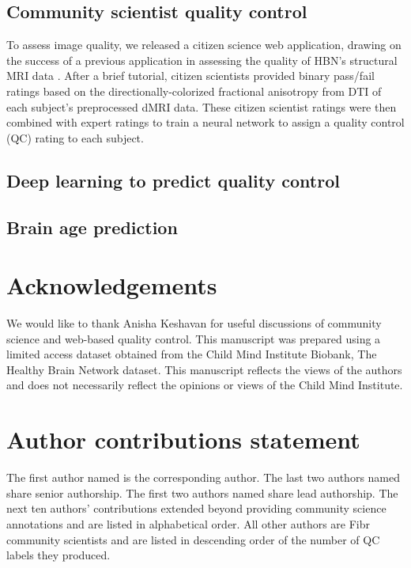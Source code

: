 \documentclass[fleqn,10pt]{wlscirep}
\begin{document}
\subsection*{Community scientist quality control}

To assess image quality, we released a citizen science web application, drawing on the success of a previous application in assessing the quality of HBN's structural MRI data \cite{keshavan2019-er}. After a brief tutorial, citizen scientists provided binary pass/fail ratings based on the directionally-colorized fractional anisotropy from DTI of each subject's preprocessed dMRI data. These citizen scientist ratings were then combined with expert ratings to train a neural network to assign a quality control (QC) rating to each subject.

\subsection*{Deep learning to predict quality control}

\subsection*{Brain age prediction}



\section*{Acknowledgements}

We would like to thank Anisha Keshavan for useful discussions of community science and web-based quality control. This manuscript was prepared using a limited access dataset obtained from the Child Mind Institute Biobank, The Healthy Brain Network dataset. This manuscript reflects the views of the authors and does not necessarily reflect the opinions or views of the Child Mind Institute.


\section*{Author contributions statement}

The first author named is the corresponding author.
The last two authors named share senior authorship.
The first two authors named share lead authorship.
The next ten authors' contributions extended beyond providing community science annotations and are listed in alphabetical order.
All other authors are Fibr community scientists and are listed in descending order of the number of QC labels they produced.
\end{document}
